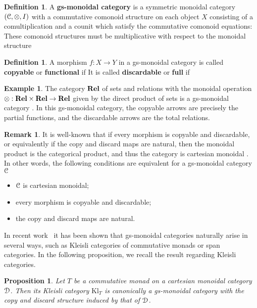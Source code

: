 \documentclass[a4paper,UKenglish,numberwithinsect,cleveref, autoref, thm-restate]{lipics-v2021}
\theoremstyle{plain} %
\newtheorem{myproposition}[mytheorem]{Proposition}
\theoremstyle{definition} %
\newtheorem{mydefinition}[mytheorem]{Definition}
\newtheorem{myremark}[mytheorem]{Remark}
\newtheorem{myexample}[mytheorem]{Example}
\begin{document}
\begin{mydefinition}
A \textbf{gs-monoidal category} is a symmetric monoidal category $(\mathcal{C}, \otimes, I)$
with a commutative comonoid structure on each object $X$ consisting of a comultiplication
and a counit
which satisfy the commutative comonoid equations:
These comonoid structures must be multiplicative with respect to the monoidal structure
\end{mydefinition}


\begin{mydefinition}
 A morphism $f:X\to Y$ in a gs-monoidal category is called \textbf{copyable} or \textbf{functional} if
 It is called \textbf{discardable} or \textbf{full} if 
\end{mydefinition}

\begin{myexample}
The category $\mathbf{Rel}$ of sets and relations with the monoidal operation $\otimes : \mathbf{Rel} \times \mathbf{Rel}\to \mathbf{Rel}$ given by the direct product of sets is a gs-monoidal category \cite{CorradiniGadducci02}. In this gs-monoidal category, the copyable arrows are precisely the partial functions, and the discardable arrows are the total relations.
\end{myexample}

\begin{myremark}\label{cartesiancase}
It is well-known that if every morphism is copyable and discardable, or equivalently if the copy and discard maps are natural, then the monoidal product is the categorical product, and thus the category is cartesian monoidal \cite{Fox:CACC}.
In other words, the following conditions are equivalent for a gs-monoidal category $\mathcal{C}$
 \begin{itemize}
  \item $\mathcal{C}$ is cartesian monoidal;
  \item every morphism is copyable and discardable;
  \item the copy and discard maps are natural.
 \end{itemize}
\end{myremark}
%
In recent work~\cite{fgtc2022lax} it has been shown that gs-monoidal categories naturally arise in several ways, such as Kleisli categories of commutative monads or span categories. In the following proposition, we recall the result regarding Kleisli categories.

\begin{myproposition}\label{monoidalgs}
 Let $T$ be a commutative monad on a cartesian monoidal category $\mathcal{D}$. 
 Then its Kleisli category $\mathrm{Kl}_T$ is canonically a gs-monoidal category with the copy and discard structure induced by that of $\mathcal{D}$.
\end{myproposition}
\end{document}
